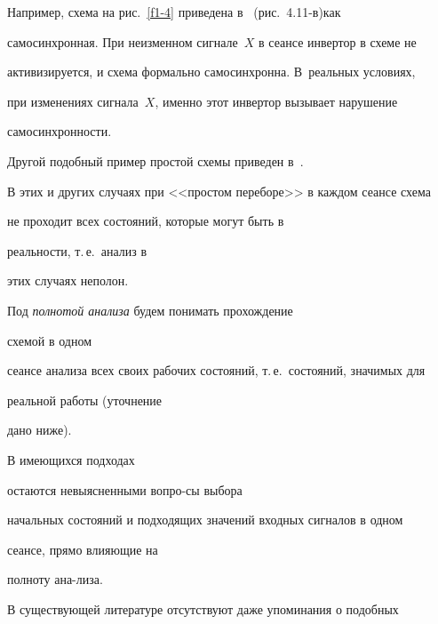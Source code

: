 Например, схема на рис.~\ref{f1-4} приведена в~\cite{1-4} (рис.~4.11-в)\linebreak как 


самосинхронная. При неизменном сигнале~$X$ в сеансе инвертор в схеме не 


активизируется, и схема формально самосинхронна. В~реальных условиях, 


при изменениях сигнала~$X$, именно этот инвертор вызывает нарушение 


самосинхронности.








Другой подобный пример простой схемы приведен в~\cite{9-4}.





В этих и других случаях при <<простом переборе>> в каждом сеансе схема 


не проходит всех состояний, которые могут быть в


реальности, т.\,е.\ анализ в 


этих случаях неполон.





Под \textit{полнотой анализа} будем понимать прохождение %


схемой в одном 


сеансе анализа всех своих рабочих состояний, т.\,е.\ состояний, значимых для 


реальной работы (уточнение %


дано ниже).





В имеющихся подходах %


остаются невыясненными во\-про-\linebreak сы выбора 


начальных со\-сто\-яний и подходящих значений входных сигналов в одном 


сеансе, прямо влияющие на %


полноту ана-\linebreak лиза.





В существующей литературе отсутствуют даже упоминания о подобных 


